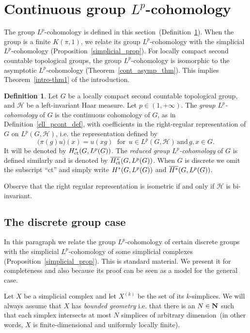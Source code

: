 \documentclass[11pt]{article}
\theoremstyle{definition}
\newtheorem{defi}[theo]{Definition}
\numberwithin{equation}{section}
\numberwithin{figure}{section}
\numberwithin{table}{section}
\DeclareMathOperator{\ct}{ct}
\begin{document}
\section{Continuous group \texorpdfstring{$L^p$}{Lp}-cohomology}\label{3}

The group $L^p$-cohomology is defined in this section~(Definition~\ref{group_L^p_def}). When the group is a finite $K(\pi, 1)$, we relate its group $L^p$-cohomology with the simplicial $L^p$-cohomology (Proposition~\ref{simplicial_prop}). For locally compact second countable topological groups, the group $L^p$-cohomology is isomorphic to the asymptotic $L^p$-cohomology (Theorem~\ref{cont_asymp_thm}). This implies Theorem~\ref{intro-thm1} of the introduction.

\begin{defi}\label{group_L^p_def}
Let $G$ be a locally compact second countable topological group, and $\mathcal H$ be a left-invariant Haar measure. Let $p \in (1, +\infty)$. The \emph{group $L^p$-cohomology} of $G$ is the continuous cohomology of $G$, as in Definition~\ref{ell_pcont_def}, with coefficients in the right-regular representation of $G$ on $L^p (G, \mathcal H)$, i.e. the representation defined by
\[
\bigl(\pi (g) u\bigr)(x) = u(xg)\;\text{ for }\,u \in L^p (G, \mathcal H)\,\text{and}\,g, x \in G.
\]
It will be denoted by ${\rm H}_{\ct}^* (G, L^p (G))$. The \emph{reduced group $L^p$-cohomology} of $G$ is defined similarly and is denoted by $\overline{{\rm H}_{\ct}^*} (G, L^p (G))$. When $G$ is discrete we omit the subscript ``ct'' and simply write ${\rm H}^* (G, L^p (G))$ and $\overline{{\rm H}^*} (G, L^p (G))$.
\end{defi}

Observe that the right regular representation is isometric if and only if $\mathcal H$ is bi-invariant.

\subsection*{The discrete group case}\label{simplicial_subsection}
In this paragraph we relate the group $L^p$-cohomology of certain discrete groups with the simplicial $L^p$-cohomology of some simplicial complexes (Proposition~\ref{simplicial_prop}). This is standard material. We present it for completeness and also because its proof can be seen as a model for the general case.

Let $X$ be a simplicial complex and let $X^{(k)}$ be the set of its $k$-simplices. We will always assume that $X$ has \emph{bounded geometry}
i.e. that there is an $N \in {\bf N}$ such that each simplex intersects at most $N$ simplices of arbitrary dimension~(in other words, $X$ is finite-dimensional and uniformly locally finite).
\end{document}
